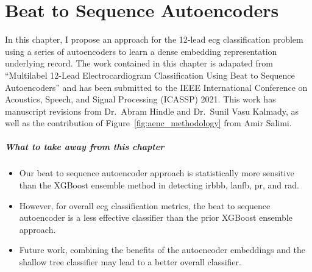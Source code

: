 \documentclass[\main/thesis.tex]{subfiles}
\begin{document}
\chapter{Beat to Sequence Autoencoders}
\label{chp:dl_autoenc}

In this chapter, I propose an approach for the 12-lead \gls{ecg} classification problem using a series of autoencoders to learn a dense embedding representation underlying record.
The work contained in this chapter is adapated from ``Multilabel 12-Lead Electrocardiogram Classification Using Beat to Sequence Autoencoders'' and has been submitted to the IEEE International Conference on Acoustics, Speech, and Signal Processing (ICASSP) 2021.
This work has manuscript revisions from Dr.\ Abram Hindle and Dr.\ Sunil Vasu Kalmady, as well as the contribution of Figure~\ref{fig:aenc_methodology} from Amir Salimi.

\paragraph{What to take away from this chapter}
\begin{itemize}
    \item Our beat to sequence autoencoder approach is statistically more sensitive than the XGBoost ensemble method in detecting \gls{irbbb}, \gls{lanfb}, \gls{pr}, and \gls{rad}.
    \item However, for overall \gls{ecg} classification metrics, the beat to sequence autoencoder is a less effective classifier than the prior XGBoost ensemble approach.
    \item Future work, combining the benefits of the autoencoder embeddings and the shallow tree classifier may lead to a better overall classifier.
\end{itemize}

\end{document}

